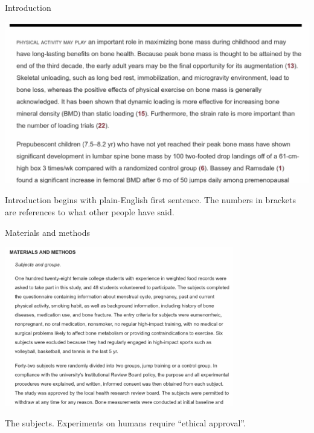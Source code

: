 \documentclass[ignorenonframetext,]{beamer}
\begin{document}
\begin{frame}{Introduction}
\protect\hypertarget{introduction-1}{}

\includegraphics[width=\textwidth]{intro}

Introduction begins with plain-English first sentence. The numbers in
brackets are references to what other people have said.

\end{frame}

\begin{frame}{Materials and methods}
\protect\hypertarget{materials-and-methods}{}

\includegraphics[width=0.75\textwidth]{matmeth}

The subjects. Experiments on humans require ``ethical approval''.

\end{frame}
\end{document}
